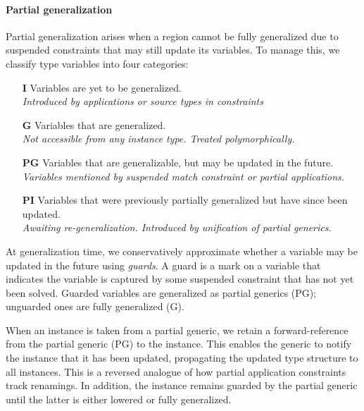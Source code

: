 \documentclass[acmsmall,screen,nonacm,review]{acmart}
\begin{document}
\paragraph{Partial generalization}

Partial generalization arises when a region cannot be fully
generalized due to suspended constraints that may still update
its variables. To manage this, we classify type variables
into four categories:

\begin{itemize}
  \item[\textbf{I}] Variables are yet to be generalized. \\
    \emph{Introduced by applications or source types in constraints}

  \item[\textbf{G}] Variables that are generalized. \\
    \emph{Not accessible from any instance type. Treated polymorphically.}

  \item[\textbf{PG}] Variables that are generalizable, but may be
    updated in the future. \\
    \emph{Variables mentioned by suspended match constraint or partial applications.}

  \item[\textbf{PI}] Variables that were previously partially generalized
    but have since been updated.  \\
    \emph{Awaiting re-generalization. Introduced by unification of partial generics.}
\end{itemize}

At generalization time, we conservatively approximate whether a variable may be
updated in the future using \emph{guards}. A guard is a mark on a variable that
indicates the variable is captured by some suspended constraint that has not
yet been solved. Guarded variables are generalized as partial generics (PG);
unguarded ones are fully generalized (G).

When an instance is taken from a partial generic, we retain a forward-reference
from the partial generic (PG) to the instance. This enables the generic to
notify the instance that it has been updated, propagating the updated type
structure to all instances. This is a reversed analogue of how partial
application constraints track renamings. In addition, the instance remains
guarded by the partial generic until the latter is either lowered or fully
generalized.
\end{document}
